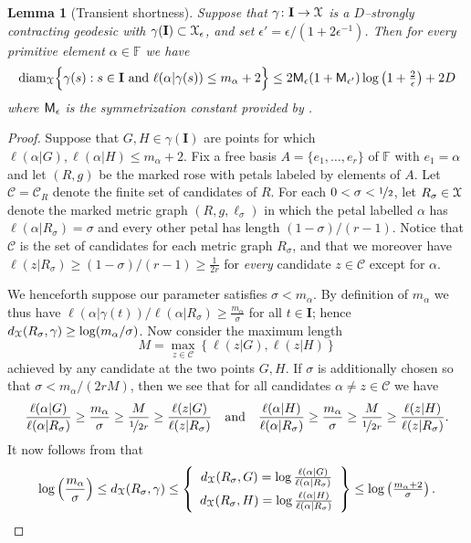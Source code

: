 \documentclass[letterpaper,fleqn]{article}
\theoremstyle{plain}
\newtheorem{lemma}[theorem]{Lemma}
\theoremstyle{definition}
\DeclareMathOperator{\diam}{diam}
\newcommand{\inv}{^{-1}}
\newcommand{\free}{\mathbb{F}} %
\newcommand{\os}{{\EuScript X}} %
\newcommand{\sym}{{\sf M}} %
\renewcommand{\diam}{\mathrm{diam}}
\newcommand{\I}{\mathbf{I}}
\begin{document}
\begin{lemma}[Transient shortness]\label{lem:thick strong contract}
Suppose that $\gamma\colon \I\to \os$ is a $D$--strongly contracting geodesic with $\gamma(\I)\subset \os_\epsilon$, and set $\epsilon' = \epsilon/(1+2\epsilon\inv)$. Then for every primitive element $\alpha \in \free$ we have
\[\diam_\os\Big\{\gamma(s) : s\in \I \text{ and } \ell(\alpha\vert\gamma(s)) \le m_\alpha + 2\Big\} \le 2\sym_{\epsilon}(1+\sym_{\epsilon'})\log\left(1+\tfrac{2}{\epsilon}\right) + 2D\]
where $\sym_\epsilon$ is the symmetrization constant provided by .
\end{lemma}
\begin{proof}
Suppose that $G,H\in \gamma(\I)$ are points for which $\ell(\alpha\vert G),\ell(\alpha\vert H) \le m_\alpha + 2$. 
Fix a free basis $A =\{e_1,\dotsc,e_r\}$ of $\free$ with $e_1 = \alpha$ and let $(R,g)$ be the marked rose with petals labeled by elements of $A$. Let $\mathcal{C} = \mathcal{C}_R$ denote the finite set of candidates of $R$. For each $0 < \sigma < \nicefrac{1}{2}$, let $R_\sigma\in \os$ denote the marked metric graph $(R,g,\ell_\sigma)$ in which the petal labelled $\alpha$ has $\ell(\alpha\vert R_\sigma) = \sigma$ and every other petal has length $(1-\sigma)/(r-1)$. Notice that $\mathcal{C}$ is the set of candidates for each metric graph $R_\sigma$, and that we moreover have $\ell(z\vert R_\sigma) \ge (1-\sigma)/(r-1)\ge \frac{1}{2r}$ for \emph{every} candidate $z\in \mathcal{C}$ except for $\alpha$. 

We henceforth suppose our parameter satisfies $\sigma < m_\alpha$. By definition of $m_\alpha$ we thus have $\ell(\alpha\vert \gamma(t))/\ell(\alpha\vert R_\sigma)\ge \frac{m_\alpha}{\sigma}$ for all $t\in \I$; hence $d_\os(R_\sigma,\gamma) \ge \log(m_\alpha/\sigma)$. Now consider the maximum length
\[M = \max_{z\in \mathcal{C}}\left\{\ell(z\vert G), \ell(z\vert H)\right\}\]
achieved by any candidate at the two points $G,H$. If $\sigma$ is additionally chosen so that $\sigma < m_\alpha/(2rM)$, then we see that for all candidates $\alpha\neq z\in \mathcal{C}$ we have
\[\frac{\ell(\alpha\vert G)}{\ell(\alpha\vert R_\sigma)}\ge \frac{m_\alpha}{\sigma} \ge \frac{M}{\nicefrac{1}{2r}} \ge \frac{\ell(z\vert G)}{\ell(z\vert R_\sigma)}
\quad\text{and}\quad
\frac{\ell(\alpha\vert H)}{\ell(\alpha\vert R_\sigma)}\ge \frac{m_\alpha}{\sigma} \ge \frac{M}{\nicefrac{1}{2r}} \ge \frac{\ell(z\vert H)}{\ell(z\vert R_\sigma)}.\]
It now follows from  that
\[\log\left(\frac{m_\alpha}{\sigma}\right) \le d_\os(R_\sigma,\gamma) \le 
\left\{\begin{array}{c} 
d_\os(R_\sigma,G) = \log\frac{\ell(\alpha\vert G)}{\ell(\alpha\vert R_\sigma)}\vspace{3pt}\\
d_\os(R_\sigma,H) = \log\frac{\ell(\alpha\vert H)}{\ell(\alpha\vert R_\sigma)}
\end{array}\right\}\le \log\left(\tfrac{m_\alpha + 2}{\sigma}\right).\]


\end{proof}
\end{document}

